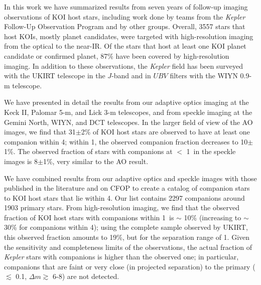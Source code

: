 \documentclass[twocolumn,appendixfloats]{aastex6}
\begin{document}
In this work we have summarized results from seven years of follow-up 
imaging observations of KOI host stars, including work done by teams 
from the {\it Kepler} Follow-Up Observation Program and by other groups. 
Overall, 3557 stars that host KOIs, mostly planet candidates, were targeted 
with high-resolution imaging from the optical to the near-IR. Of the stars that 
host at least one KOI planet candidate or confirmed planet, 87\% have been 
covered by high-resolution imaging. In addition to these observations, the 
{\it Kepler} field has been surveyed with the UKIRT telescope in the $J$-band 
and in $UBV$ filters with the WIYN 0.9-m telescope.

We have presented in detail the results from our adaptive optics 
imaging at the Keck II, Palomar 5-m, and Lick 3-m telescopes, and 
from speckle imaging at the Gemini North, WIYN, and DCT telescopes. 
In the larger field of view of the AO images, we find that 31$\pm$2\% 
of KOI host stars are observed to have at least one companion within 
4\arcsec; within 1\arcsec, the observed companion fraction decreases 
to 10$\pm$1\%. The observed fraction of stars with companions at 
$<$ 1\arcsec\ in the speckle images is 8$\pm$1\%, very similar to the 
AO result.
 
We have combined results from our adaptive optics and speckle 
images with those published in the literature and on CFOP to create 
a catalog of companion stars to KOI host stars that lie within 4\arcsec. 
Our list contains 2297 companions around 1903 primary stars.
From high-resolution imaging, we find that the observed fraction of KOI host
stars with companions within 1\arcsec\ is $\sim$ 10\% (increasing to $\sim$
30\% for companions within 4\arcsec); using the complete sample
observed by UKIRT, this observed fraction amounts to 19\%, but for the 
separation range of 1\arcsec. Given the sensitivity and completeness
limits of the observations, the actual fraction of {\it Kepler} stars with 
companions is higher than the observed one; in particular, companions that 
are faint or very close (in projected separation) to the primary ($\lesssim$ 
0.1\arcsec, $\Delta m \gtrsim$ 6-8) are not detected.
\end{document}
